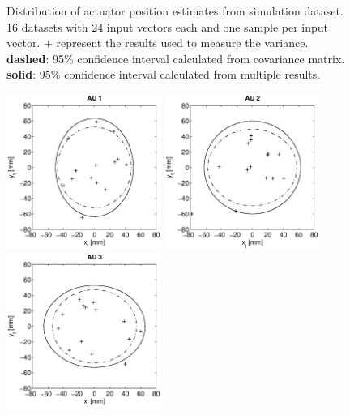 \begin{figure}[hbtp]
\caption{Distribution of actuator position estimates from simulation dataset. 16 datasets with 24 input vectors each and one sample per input vector.
$\mathbf{+}$ represent the results used to measure the variance.
\textbf{dashed}: 95\% confidence interval calculated from covariance matrix.
\textbf{solid}: 95\% confidence interval calculated from multiple results. }
\label{fig:result_95pc_confidence_all}
\end{figure}

\vspace*{\fill}

\begin{figure}[hbtp]
\captionsetup{width=0.9\textwidth}
\centering
\includegraphics[width = 0.45\textwidth]{images/results/real_confidence_95_interval_AU1.eps}
\includegraphics[width = 0.45\textwidth]{images/results/real_confidence_95_interval_AU2.eps} \\
\includegraphics[width = 0.45\textwidth]{images/results/real_confidence_95_interval_AU3.eps}

\end{figure}
